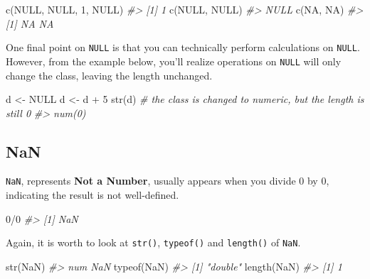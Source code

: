 \documentclass[
]{book}
\newenvironment{Shaded}{\begin{snugshade}}{\end{snugshade}}
\newcommand{\CommentTok}[1]{\textcolor[rgb]{0.56,0.35,0.01}{\textit{#1}}}
\newcommand{\ConstantTok}[1]{\textcolor[rgb]{0.00,0.00,0.00}{#1}}
\newcommand{\DecValTok}[1]{\textcolor[rgb]{0.00,0.00,0.81}{#1}}
\newcommand{\FunctionTok}[1]{\textcolor[rgb]{0.00,0.00,0.00}{#1}}
\newcommand{\NormalTok}[1]{#1}
\newcommand{\OtherTok}[1]{\textcolor[rgb]{0.56,0.35,0.01}{#1}}
\newcommand{\SpecialCharTok}[1]{\textcolor[rgb]{0.00,0.00,0.00}{#1}}
\begin{document}
\begin{Shaded}
\begin{Highlighting}[]
\FunctionTok{c}\NormalTok{(}\ConstantTok{NULL}\NormalTok{, }\ConstantTok{NULL}\NormalTok{, }\DecValTok{1}\NormalTok{, }\ConstantTok{NULL}\NormalTok{)}
\CommentTok{\#\textgreater{} [1] 1}
\FunctionTok{c}\NormalTok{(}\ConstantTok{NULL}\NormalTok{, }\ConstantTok{NULL}\NormalTok{)}
\CommentTok{\#\textgreater{} NULL}
\FunctionTok{c}\NormalTok{(}\ConstantTok{NA}\NormalTok{, }\ConstantTok{NA}\NormalTok{)}
\CommentTok{\#\textgreater{} [1] NA NA}
\end{Highlighting}
\end{Shaded}

One final point on \texttt{NULL} is that you can technically perform calculations on \texttt{NULL}. However, from the example below, you'll realize operations on \texttt{NULL} will only change the class, leaving the length unchanged.

\begin{Shaded}
\begin{Highlighting}[]
\NormalTok{d }\OtherTok{\textless{}{-}} \ConstantTok{NULL}
\NormalTok{d }\OtherTok{\textless{}{-}}\NormalTok{ d }\SpecialCharTok{+} \DecValTok{5}
\FunctionTok{str}\NormalTok{(d) }\CommentTok{\# the class is changed to numeric, but the length is still 0}
\CommentTok{\#\textgreater{}  num(0)}
\end{Highlighting}
\end{Shaded}

\hypertarget{NaN}{%
\subsection{NaN}\label{NaN}}

\texttt{NaN}, represents \textbf{Not a Number}, usually appears when you divide 0 by 0, indicating the result is not well-defined.

\begin{Shaded}
\begin{Highlighting}[]
\DecValTok{0}\SpecialCharTok{/}\DecValTok{0}
\CommentTok{\#\textgreater{} [1] NaN}
\end{Highlighting}
\end{Shaded}

Again, it is worth to look at \texttt{str()}, \texttt{typeof()} and \texttt{length()} of \texttt{NaN}.

\begin{Shaded}
\begin{Highlighting}[]
\FunctionTok{str}\NormalTok{(}\ConstantTok{NaN}\NormalTok{)}
\CommentTok{\#\textgreater{}  num NaN}
\FunctionTok{typeof}\NormalTok{(}\ConstantTok{NaN}\NormalTok{)}
\CommentTok{\#\textgreater{} [1] "double"}
\FunctionTok{length}\NormalTok{(}\ConstantTok{NaN}\NormalTok{)}
\CommentTok{\#\textgreater{} [1] 1}
\end{Highlighting}
\end{Shaded}
\end{document}
